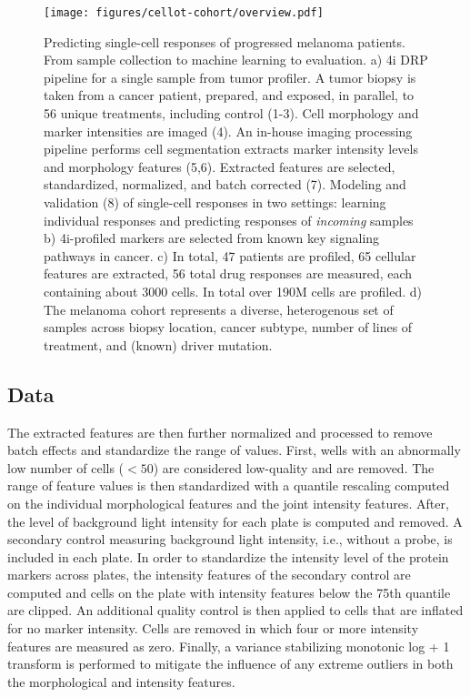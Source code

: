 \begin{figure}[h!]
  \centering
  \texttt{[image: figures/cellot-cohort/overview.pdf]}
  \caption{
    Predicting single-cell responses of progressed melanoma patients.
    From sample collection to machine learning to evaluation.
    a) 4i DRP pipeline for a single sample from tumor profiler.
    A tumor biopsy is taken from a cancer patient, prepared,
    and exposed, in parallel, to 56 unique treatments, including control (1-3).
    Cell morphology and marker intensities are imaged (4).
    An in-house imaging processing pipeline performs cell segmentation
    extracts marker intensity levels and morphology features (5,6).
    Extracted features are selected, standardized, normalized, and batch corrected (7).
    Modeling and validation (8) of single-cell responses in two settings: learning individual responses and predicting responses of \emph{incoming} samples
    b) 4i-profiled markers are selected from known key signaling pathways in cancer.
    c) In total, 47 patients are profiled, 65 cellular features are extracted, 56 total drug responses are measured, each containing about 3000 cells. In total over 190M cells are profiled.
    d) The melanoma cohort represents a diverse, heterogenous set of samples
    across biopsy location, cancer subtype, number of lines of treatment, and (known) driver mutation.
  }\label{fig:cellot-cohort-overview}
\end{figure}

\subsection{Data}

The extracted features are then further normalized and processed to remove batch effects and standardize the range of values. First, wells with an abnormally low number of cells ($< 50$) are considered low-quality and are removed.
The range of feature values is then standardized with a quantile rescaling computed on the individual morphological features and the joint intensity features.
After, the level of background light intensity for each plate is computed and removed.
A secondary control measuring background light intensity, i.e., without a probe, is included in each plate. 
In order to standardize the intensity level of the protein markers across plates, the intensity features of the secondary control are computed and cells on the plate with intensity features below the 75th quantile are clipped.
An additional quality control is then applied to cells that are inflated for no marker intensity.
Cells are removed in which four or more intensity features are measured as zero.
Finally, a variance stabilizing monotonic log + 1 transform is performed to mitigate the influence of any extreme outliers in both the morphological and intensity features.

